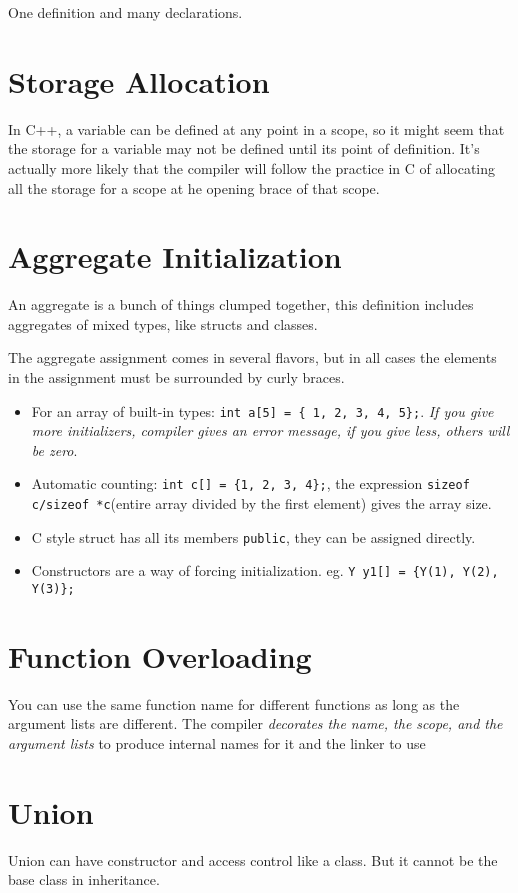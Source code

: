\documentclass[11pt, a4paper]{book}
\begin{document}
One definition and many declarations.

\section{Storage Allocation}
In C++, a variable can be defined at any point in a scope, so it might seem that
the storage for a variable may not be defined until its point of definition.
It's actually more likely that the compiler will follow the practice in C of
allocating all the storage for a scope at he opening brace of that scope.

\section{Aggregate Initialization}
An aggregate is a bunch of things clumped together, this definition includes
aggregates of mixed types, like structs and classes. 

The aggregate assignment comes in several flavors, but in all cases the elements
in the assignment must be surrounded by curly braces.

\begin{itemize}
\item For an array of built-in types: \verb|int a[5] = { 1, 2, 3, 4, 5};|.
\emph{If you give more initializers, compiler gives an error message, if you
give less, others will be zero}.
\item Automatic counting: \verb|int c[] = {1, 2, 3, 4};|, the expression
\verb|sizeof c/sizeof *c|(entire array divided by the first element) gives the
array size.
\item C style struct has all its members \verb|public|, they can be assigned
directly.
\item Constructors are a way of forcing initialization. eg.
\verb|Y y1[] = {Y(1), Y(2), Y(3)};|
\end{itemize}
\section{Function Overloading}
You can use the same function name for different functions as long as the
argument lists are different. The compiler \emph{decorates the name, the scope,
and the argument lists} to produce internal names for it and the linker to use
\section{Union}
Union can have constructor and access control like a class. But it cannot be the
base class in inheritance.
\end{document}
